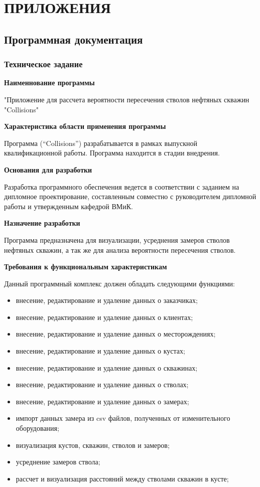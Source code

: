 \newpage
\section*{ПРИЛОЖЕНИЯ}

\subsection*{Программная документация}

\subsubsection*{Техническое задание}

\textbf{Наименнование программы}

"Приложение для рассчета вероятности пересечения стволов нефтяных скважин "Collisions"

\textbf{Характеристика области применения программы}

Программа (“Collisions”) разрабатывается в рамках выпускной квалификационной работы. Программа находится в стадии внедрения.

\textbf{Основания для разработки}

Разработка программного обеспечения ведется в соответствии с заданием на дипломное проектирование, составленным совместно с
руководителем дипломной работы и утвержденным кафедрой ВМиК.

\textbf{Назначение разработки}

Программа предназначена для визуализации, усреднения замеров стволов нефтяных скважин, а так же для анализа вероятности пересечения
стволов.

\textbf{Требования к функциональным характеристикам}

Данный программный комплекс должен обладать следующими функциями:
\begin{itemize}
  \item внесение, редактирование и удаление данных о заказчиках;
  \item внесение, редактирование и удаление данных о клиентах;
  \item внесение, редактирование и удаление данных о месторождениях;
  \item внесение, редактирование и удаление данных о кустах;
  \item внесение, редактирование и удаление данных о скважинах;
  \item внесение, редактирование и удаление данных о стволах;
  \item внесение, редактирование и удаление данных о замерах;
  \item импорт данных замера из csv файлов, полученных от изменительного оборудования;
  \item визуализация кустов, скважин, стволов и замеров;
  \item усреднение замеров ствола;
  \item рассчет и визуализация расстояний между стволами скважин в кусте;
\end{itemize}

